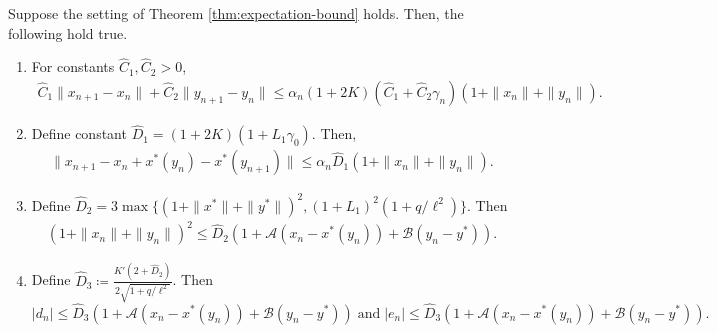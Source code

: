 \documentclass[10pt,a4paper]{amsart}
\newcommand{\Acal}{\mathcal{A}}
\newcommand{\Bcal}{\mathcal{B}}
\newcommand{\hC}{\hat{C}}
\newcommand{\hD}{\hat{D}}
\newcommand{\xstar}{x^*}
\newcommand{\ystar}{y^*}
\begin{document}
\begin{lemma}\label{lem:inter-bounds}
    Suppose the setting of Theorem \ref{thm:expectation-bound} holds. Then, the following hold true.
    \begin{enumerate}[label=(\alph*)]
        \item \label{lem-part:gen-diff-bound} For constants $\hC_1,\hC_2>0$, 
        \begin{align*}
        \hC_1\|x_{n+1}-x_n\|+\hC_2\|y_{n+1}-y_n\|\leq \alpha_n(1+2K)\left(\hC_1+\hC_2\gamma_n\right)(1+\|x_n\|+\|y_n\|).
        \end{align*}
        \item \label{lem-part:x-diff-bound} Define constant $\hD_1=(1+2K)(1+L_1\gamma_0)$. Then,
        \begin{align*}
        \|x_{n+1}-x_n+\xstar(y_n)-\xstar(y_{n+1})\|\leq \alpha_n\hD_1(1+\|x_n\|+\|y_n\|).
        \end{align*} 
        \item \label{lem-part:crude-bound} Define $\hD_2=3\max\{(1+\|x^*\|+\|y^*\|)^2,(1+L_1)^2(1+q/\ell^2)\}$. Then
    \begin{align*}
        (1+\|x_n\|+\|y_n\|)^2\leq \hD_2(1+\Acal(x_n-x^*(y_n))+\Bcal(y_n-y^*)).
    \end{align*}
    \item \label{lem-part:telescoping-diff-bound}Define $\hD_3\coloneqq\frac{K'(2+\hD_2)}{2\sqrt{1+q/\ell^2}}$. Then $$|d_n|\leq \hD_3(1+\Acal(x_n-\xstar(y_n))+\Bcal(y_n-\ystar))\;\text{and}\;|e_n|\leq \hD_3(1+\Acal(x_n-\xstar(y_n))+\Bcal(y_n-\ystar)).$$
    \end{enumerate}
\end{lemma}
\end{document}
